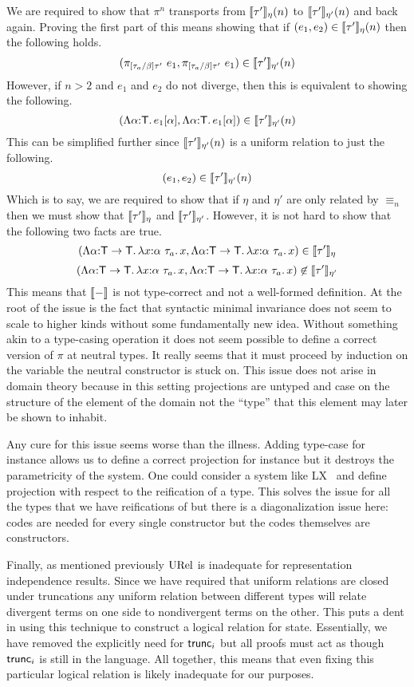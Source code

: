 We are required to show that $\pi^n$ transports from
$\llbracket \tau' \rrbracket_\eta(n)$ to $\llbracket \tau' \rrbracket_{\eta'}(n)$ and back again. Proving
the first part of this means showing that if
$(e_1, e_2) \in \llbracket \tau' \rrbracket_\eta(n)$ then the following holds.
\[
  (\pi_{[\tau_a/\beta]\tau'}\ e_1, \pi_{[\tau_a/\beta]\tau'}\ e_1)
  \in \llbracket \tau' \rrbracket_{\eta'}(n)
\]
However, if $n > 2$ and $e_1$ and $e_2$ do not diverge, then this is
equivalent to showing the following.
\[
  (\Lambda \alpha {:} \mathsf{T}.\, e_1[\alpha], \Lambda \alpha {:} \mathsf{T}.\, e_1[\alpha])
  \in \llbracket \tau' \rrbracket_{\eta'}(n)
\]
This can be simplified further since $\llbracket \tau' \rrbracket_{\eta'}(n)$ is a uniform
relation to just the following.
\[
  (e_1, e_2) \in \llbracket \tau' \rrbracket_{\eta'}(n)
\]
Which is to say, we are required to show that if $\eta$ and $\eta'$
are only related by $\equiv_n$ then we must show that
$\llbracket \tau' \rrbracket_{\eta}$ and $\llbracket \tau' \rrbracket_{\eta'}$. However, it is not
hard to show that the following two facts are true.
\[
  (\Lambda \alpha {:} \mathsf{T} \to \mathsf{T}.\, \lambda x {:} \alpha\ \tau_a.\, x,
   \Lambda \alpha {:} \mathsf{T} \to \mathsf{T}.\, \lambda x {:} \alpha\ \tau_a.\, x)
   \in \llbracket \tau' \rrbracket_\eta
\]
\[
  (\Lambda \alpha {:} \mathsf{T} \to \mathsf{T}.\, \lambda x {:} \alpha\ \tau_a.\, x,
   \Lambda \alpha {:} \mathsf{T} \to \mathsf{T}.\, \lambda x {:} \alpha\ \tau_a.\, x)
   \not\in \llbracket \tau' \rrbracket_{\eta'}
\]
This means that $\llbracket - \rrbracket$ is not type-correct and not a well-formed
definition. At the root of the issue is the fact that syntactic
minimal invariance does not seem to scale to higher kinds without some
fundamentally new idea. Without something akin to a type-casing
operation it does not seem possible to define a correct version of
$\pi$ at neutral types. It really seems that it must proceed by
induction on the variable the neutral constructor is stuck on. This
issue does not arise in domain theory because in this setting
projections are untyped and case on the structure of the element of
the domain not the ``type'' that this element may later be shown to
inhabit.

Any cure for this issue seems worse than the illness. Adding type-case
for instance allows us to define a correct projection for instance but
it destroys the parametricity of the system. One could consider a
system like LX~\citep{Crary:99} and define projection with respect to
the reification of a type. This solves the issue for all the
types that we have reifications of but there is a diagonalization
issue here: codes are needed for every single constructor but the
codes themselves are constructors.

Finally, as mentioned previously $\mathrm{URel}$ is inadequate for
representation independence results. Since we have required that
uniform relations are closed under truncations any uniform relation
between different types will relate divergent terms on one side to
nondivergent terms on the other. This puts a dent in using this
technique to construct a logical relation for state. Essentially, we
have removed the explicitly need for $\mathsf{trunc}_i$ but all proofs must
act as though $\mathsf{trunc}_i$ is still in the language. All together, this
means that even fixing this particular logical relation is likely
inadequate for our purposes.

